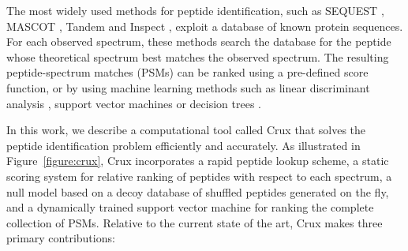 \documentclass{bioinfo}
\begin{document}
The most widely used methods for peptide identification, such as
SEQUEST \cite{eng:approach}, MASCOT \cite{}, Tandem \cite{} and
Inspect \cite{}, exploit a database of known protein sequences.  For
each observed spectrum, these methods search the database for the
peptide whose theoretical spectrum best matches the observed spectrum.
The resulting peptide-spectrum matches (PSMs) can be ranked using a
pre-defined score function, or by using machine learning methods such
as linear discriminant analysis \cite{}, support vector machines
\cite{} or decision trees \cite{}.

In this work, we describe a computational tool called Crux that solves
the peptide identification problem efficiently and accurately.  As
illustrated in Figure~\ref{figure:crux}, Crux incorporates a rapid
peptide lookup scheme, a static scoring system for relative ranking of
peptides with respect to each spectrum, a null model based on a decoy
database of shuffled peptides generated on the fly, and a dynamically
trained support vector machine for ranking the complete collection of
PSMs.  Relative to the current state of the art, Crux makes three
primary contributions:
\end{document}
